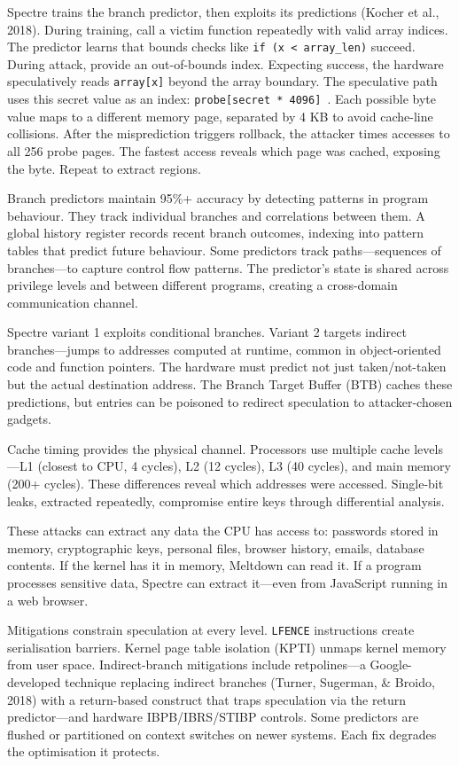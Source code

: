 Spectre trains the branch predictor, then exploits its predictions (Kocher et al., 2018). During training, call a victim function repeatedly with valid array indices. The predictor learns that bounds checks like \texttt{if (x < array\_len)} succeed. During attack, provide an out-of-bounds index. Expecting success, the hardware speculatively reads \texttt{array[x]} beyond the array boundary. The speculative path uses this secret value as an index: \texttt{probe[secret * 4096] }. Each possible byte value maps to a different memory page, separated by 4 KB to avoid cache-line collisions. After the misprediction triggers rollback, the attacker times accesses to all 256 probe pages. The fastest access reveals which page was cached, exposing the byte. Repeat to extract regions.

Branch predictors maintain 95\%+ accuracy by detecting patterns in program behaviour. They track individual branches and correlations between them. A global history register records recent branch outcomes, indexing into pattern tables that predict future behaviour. Some predictors track paths—sequences of branches—to capture control flow patterns. The predictor's state is shared across privilege levels and between different programs, creating a cross-domain communication channel.

Spectre variant 1 exploits conditional branches. Variant 2 targets indirect branches—jumps to addresses computed at runtime, common in object-oriented code and function pointers. The hardware must predict not just taken/not-taken but the actual destination address. The Branch Target Buffer (BTB) caches these predictions, but entries can be poisoned to redirect speculation to attacker-chosen gadgets.

Cache timing provides the physical channel. Processors use multiple cache levels—L1 (closest to CPU, 4 cycles), L2 (12 cycles), L3 (40 cycles), and main memory (200+ cycles). These differences reveal which addresses were accessed. Single-bit leaks, extracted repeatedly, compromise entire keys through differential analysis.

These attacks can extract any data the CPU has access to: passwords stored in memory, cryptographic keys, personal files, browser history, emails, database contents. If the kernel has it in memory, Meltdown can read it. If a program processes sensitive data, Spectre can extract it—even from JavaScript running in a web browser. 

Mitigations constrain speculation at every level. \texttt{LFENCE} instructions create serialisation barriers. Kernel page table isolation (KPTI) unmaps kernel memory from user space. Indirect-branch mitigations include retpolines—a Google-developed technique replacing indirect branches (Turner, Sugerman, \& Broido, 2018) with a return-based construct that traps speculation via the return predictor—and hardware IBPB/IBRS/STIBP controls. Some predictors are flushed or partitioned on context switches on newer systems. Each fix degrades the optimisation it protects.

